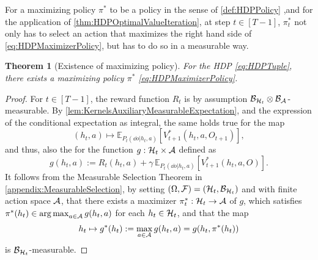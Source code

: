 \documentclass[
    a4paper,
    11pt,
    bibliography=totoc,
    listof=totoc,      
    headinclude=true,
    cleardoublepage=empty,
]{scrbook}
\theoremstyle{plain}
\newtheorem{theorem}{Theorem}[chapter]
\theoremstyle{definition}
\theoremstyle{remark}
\newcommand{\E}{\mathbb E}
\newcommand{\SpaceA}{{\cal A}}
\newcommand{\SpaceH}{{\cal H}}
\DeclareMathOperator*{\argmax}{arg\,max}
\begin{document}
For a maximizing policy $\pi^*$ to be a policy in the sense of
\cref{def:HDPPolicy} ,and for the application of 
\cref{thm:HDPOptimalValueIteration}, at step $t\in[T-1]$, $\pi^*_t$ not only 
has to select an action that maximizes the right hand side of
\eqref{eq:HDPMaximizerPolicy}, but has to do so in a measurable way.

\begin{theorem}[Existence of maximizing policy]
\label{thm:HDPOptimalPolicyExistence}
    For the HDP \eqref{eq:HDPTuple}, there exists a maximizing policy $\pi^*$ 
    \eqref{eq:HDPMaximizerPolicy}.
\end{theorem}
\begin{proof}
    For $t\in[T-1]$, the reward function $R_t$ is by assumption 
    $\mathcal{B}_{\SpaceH_t}\otimes \mathcal{B}_\SpaceA$-measurable. By 
    \cref{lem:KernelsAuxiliaryMeasurableExpectation}, and the expression of 
    the conditional expectation as integral, the same holds true for the map
    \[
        (h_t,a)\mapsto \E_{P_t(\dd{o}|h_t,a)}[V^*_{t+1}(h_t,a,O_{t+1})],
    \]
    and thus, also the for the function $g:\SpaceH_t\times\SpaceA$ defined as
    \[
        g(h_t,a) := 
        R_t(h_t,a) + \gamma\, \E_{P_t(\dd{o}|h_t,a)}[V^*_{t+1}(h_t,a,O)].
    \]
    It follows from the Measurable Selection Theorem in 
    \cref{appendix:MeasurableSelection}, by setting $(\Omega, \mathcal{F}) = 
    (\SpaceH_t,\mathcal{B}_{\SpaceH_t})$ and with finite action
    space $\SpaceA$, that there exists a maximizer $\pi^*_t:\SpaceH_t\to
    \SpaceA$ of $g$, which satisfies $\pi^*(h_t)\in\argmax_{a\in\SpaceA} 
    g(h_t,a)$ for each $h_t\in\SpaceH_t$, and that the map
    \[
        h_t \mapsto g^*(h_t) := \max_{a\in\SpaceA} g(h_t,a) = g(h_t,\pi^*(h_t))
    \]
    is $\mathcal{B}_{\SpaceH_t}$-measurable.
\end{proof}
\end{document}
